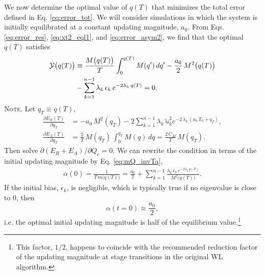 \documentclass[reprint, superscriptaddress, floatfix]{revtex4-1}
\newcommand{\note}[1]{{\color{DarkGreen}\footnotesize \textsc{Note.} #1}}
\newcommand{\Err}{E}
\begin{document}
We now determine the optimal value of $q(T)$
that minimizes the total error defined in Eq. \eqref{eq:error_tot}.
%
We will consider simulations in which
the system is initially equilibrated at a
constant updating magnitude, $a_0$.
%
From Eqs. \eqref{eq:error_res}, \eqref{eq:xt2_eql1},
and \eqref{eq:error_asym2},
we find that
the optimal $q(T)$ satisfies
%
\begin{align}
  \mathcal Y\bigl( q(T) \bigr)
  &\equiv
  \frac{ M\bigl( q(T) \bigr) } { T }
    \int_0^{q(T)} M(q') \, d q'
  -\frac{a_0}{2} \, M^2\bigl( q(T) \bigr)
  \notag \\
  &
  -\sum_{k = 1}^{n-1}
  \lambda_k \, \epsilon_k \, e^{-2\lambda_k \, q(T)}
  =0
  .
\label{eq:opt_qT}
\end{align}
%
%
\note{Let $q_T \equiv q(T)$,
$$
\begin{aligned}
  \frac{
    \partial \Err_R(T)
  }
  {
    \partial q_T
  }
  &=
  -a_0 \, M^2(q_T)
  -2
  \sum_{k=1}^{n-1} \lambda_k \,
  \tilde u_k^2 e^{-2 \, \lambda_k \, (a_0 \, T_0 + q_T)}
  ,
  \\
  \frac{
    \partial \Err_A(T)
  }
  {
    \partial q_T
  }
  &=
  \frac 2 T \,
  M(q_T) \,
  \int_0^{ q_T } M(q) \, dq
  =
  \frac{ 2 \, C_M } { T } \, M(q_T)
  .
\end{aligned}
$$
Then solve $\partial (\Err_R + \Err_A) / \partial Q_c = 0$.
}
%
We can rewrite the condition in terms of
the initial updating magnitude by Eq. \eqref{eq:mQ_invTa},
\begin{align}
  \alpha(0)
  =
  \frac{1}{T \, m\bigl( q(T) \bigr) }
  =
  \frac{ a_0 } { 2 }
  +
  \sum_{k = 1}^{n-1}
  \frac{
    \lambda_k \, \epsilon_k \, e^{-2\lambda_k \, q(T)}
  }{M^2\bigl( q(T) \bigr)}
  .
  \label{eq:opt_alpha0}
\end{align}
%
If the initial bias, $\epsilon_k$, is negligible,
which is typically true if no eigenvalue is close to $0$,
then
%
\begin{equation}
  \alpha( t = 0 )
  \approx
  \frac{ a_0 }
       { 2 }
  ,
\label{eq:half_alpha0}
\end{equation}
%
i.e. the optimal initial updating magnitude
is half of the equilibrium value.\footnote{This factor, $1/2$,
happens to coincide with the
recommended reduction factor of the updating magnitude
at stage transitions
in the original WL algorithm\cite{
wang2001, *wang2001pre}.
}
\end{document}
